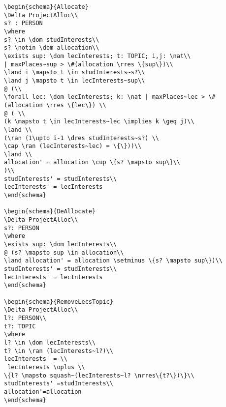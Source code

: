\begin{verbatim}
\begin{schema}{Allocate}
\Delta ProjectAlloc\\
s? : PERSON
\where
s? \in \dom studInterests\\
s? \notin \dom allocation\\
\exists sup: \dom lecInterests; t: TOPIC; i,j: \nat\\
| maxPlaces~sup > \#(allocation \rres \{sup\})\\
\land i \mapsto t \in studInterests~s?\\
\land j \mapsto t \in lecInterests~sup\\
@ (\\
\forall lec: \dom lecInterests; k: \nat | maxPlaces~lec > \# (allocation \rres \{lec\}) \\
@ ( \\
(k \mapsto t \in lecInterests~lec \implies k \geq j)\\
\land \\
(\ran (1\upto i-1 \dres studInterests~s?) \\
\cap \ran (lecInterests~lec) = \{\}))\\
\land \\
allocation' = allocation \cup \{s? \mapsto sup\}\\
)\\
studInterests' = studInterests\\
lecInterests' = lecInterests
\end{schema}

\begin{schema}{DeAllocate}
\Delta ProjectAlloc\\
s?: PERSON
\where
\exists sup: \dom lecInterests\\
@ (s? \mapsto sup \in allocation\\
\land allocation' = allocation \setminus \{s? \mapsto sup\})\\
studInterests' = studInterests\\
lecInterests' = lecInterests
\end{schema}

\begin{schema}{RemoveLecsTopic}
\Delta ProjectAlloc\\
l?: PERSON\\
t?: TOPIC
\where
l? \in \dom lecInterests\\
t? \in \ran (lecInterests~l?)\\
lecInterests' = \\
 lecInterests \oplus \\
\{l? \mapsto squash~(lecInterests~l? \nrres\{t?\})\}\\
studInterests' =studInterests\\
allocation'=allocation
\end{schema}


\end{verbatim}

